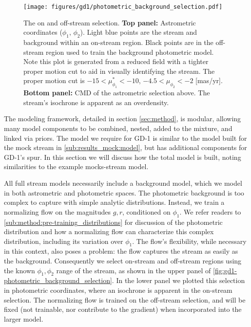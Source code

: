 \documentclass[twocolumn]{aastex631}
\newcommand{\stream}[1]{#1}
\begin{document}
        \begin{figure}
            \centering
            \texttt{[image: figures/gd1/photometric\_background\_selection.pdf]}
            \vspace{-20pt}
            \caption{%
                The on and off-stream selection.
                \textbf{Top panel:} Astrometric coordinates ($\phi_1$,
                $\phi_2$).  Light blue points are the stream and background
                within an on-stream region. Black points are in the off-stream
                region used to train the background photometric model. Note this
                plot is generated from a reduced field with a tighter proper
                motion cut to aid in visually identifying the stream.  The
                proper motion cut is $-15 < \mu_{\phi_1}^* < -10$, $-4.5 <
                \mu_{\phi_2} < -2$ [mas/yr].
                \textbf{Bottom panel:} CMD of the astrometric selection above.
                The stream's isochrone is apparent as an overdensity.
            }
            \label{fig:gd1-photometric_background_selection}
        \end{figure}

        The modeling framework, detailed in section \autoref{sec:method}, is
        modular, allowing many model components to be combined, nested, added to
        the mixture, and linked via priors.  The model we require for
        \stream{GD-1} is similar to the model built for the mock stream in
        \autoref{sub:results_mock:model}, but has additional components for
        \stream{GD-1}'s spur.  In this section we will discuss how the total
        model is built, noting similarities to the example mocks-stream model.

        All full stream models necessarily include a background model, which we
        model in both astrometric and photometric spaces.  The photometric
        background is too complex to capture with simple analytic distributions.
        Instead, we train a normalizing flow on the magnitudes $g, r$,
        conditioned on $\phi_1$. We refer readers to
        \autoref{sub:method:pre-training_distributions} for discussion of the
        photometric distribution and how a normalizing flow can characterize
        this complex distribution, including its variation over $\phi_1$.  The
        flow's flexibility, while necessary in this context, also poses a
        problem: the flow captures the stream as easily as the background.
        Consequently we select on-stream and off-stream regions using the known
        $\phi_1,\phi_2$ range of the stream, as shown in the upper panel of
        \autoref{fig:gd1-photometric_background_selection}.  In the lower panel
        we plotted this selection in photometric coordinates, where an isochrone
        is apparent in the on-stream selection.  The normalizing flow is trained
        on the off-stream selection, and will be fixed (not trainable, nor
        contribute to the gradient) when incorporated into the larger model.
\end{document}
